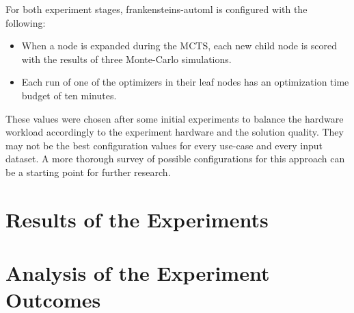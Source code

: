 For both experiment stages, frankensteins-automl is configured with the following:
\begin{itemize}
    \item When a node is expanded during the MCTS, each new child node is scored with the results of three Monte-Carlo simulations.
    \item Each run of one of the optimizers in their leaf nodes has an optimization time budget of ten minutes.
\end{itemize}
These values were chosen after some initial experiments to balance the hardware workload accordingly to the experiment hardware and the solution quality.
They may not be the best configuration values for every use-case and every input dataset.
A more thorough survey of possible configurations for this approach can be a starting point for further research.

\section{Results of the Experiments}
\label{sec:evaluation:results}

\Blindtext

\section{Analysis of the Experiment Outcomes}
\label{sec:evaluation:analysis}

\Blindtext
